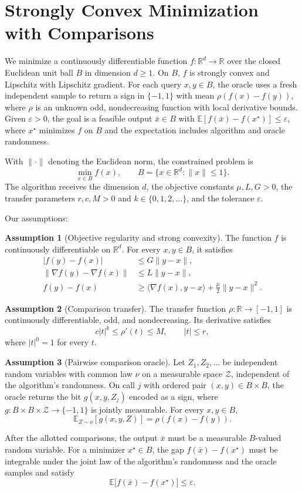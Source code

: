 \documentclass[10pt]{article}
\theoremstyle{definition}
\newtheorem{assumption}{Assumption}
\begin{document}
\section*{Strongly Convex Minimization with Comparisons}
We minimize a continuously differentiable function $f:\mathbb{R}^d\to\mathbb{R}$ over the closed Euclidean unit ball $B$ in dimension $d\geq 1$. On $B$, $f$ is strongly convex and Lipschitz with Lipschitz gradient. For each query $x,y\in B$, the oracle uses a fresh independent sample to return a sign in $\{-1,1\}$ with mean $\rho(f(x)-f(y))$, where $\rho$ is an unknown odd, nondecreasing function with local derivative bounds. Given $\varepsilon>0$, the goal is a feasible output $\bar{x}\in B$ with $\mathbb{E}[f(\bar{x})-f(x^\star)]\leq\varepsilon$, where $x^\star$ minimizes $f$ on $B$ and the expectation includes algorithm and oracle randomness.

With $\|\cdot\|$ denoting the Euclidean norm, the constrained problem is
\[
\min_{x\in B} f(x),\qquad B=\{x\in\mathbb{R}^d:\|x\|\leq 1\}.
\]
The algorithm receives the dimension $d$, the objective constants $\mu,L,G>0$, the transfer parameters $r,c,M>0$ and $k\in\{0,1,2,\ldots\}$, and the tolerance $\varepsilon$.

Our assumptions:
\begin{assumption}[Objective regularity and strong convexity]
The function $f$ is continuously differentiable on $\mathbb{R}^d$. For every $x,y\in B$, it satisfies
\[
\begin{aligned}
|f(y)-f(x)| &\leq G\|y-x\|,\\
\|\nabla f(y)-\nabla f(x)\| &\leq L\|y-x\|,\\
f(y)-f(x) &\geq \langle\nabla f(x),y-x\rangle
                 +\frac{\mu}{2}\|y-x\|^2.
\end{aligned}
\]
\end{assumption}

\begin{assumption}[Comparison transfer]
The transfer function $\rho:\mathbb{R}\to[-1,1]$ is continuously differentiable, odd, and nondecreasing. Its derivative satisfies
\[
c|t|^k\leq \rho'(t)\leq M,\qquad |t|\leq r,
\]
where $|t|^0=1$ for every $t$.
\end{assumption}

\begin{assumption}[Pairwise comparison oracle]
Let $Z_1,Z_2,\ldots$ be independent random variables with common law $\nu$ on a measurable space $\mathcal{Z}$, independent of the algorithm's randomness. On call $j$ with ordered pair $(x,y)\in B\times B$, the oracle returns the bit $g(x,y,Z_j)$ encoded as a sign, where $g:B\times B\times\mathcal{Z}\to\{-1,1\}$ is jointly measurable. For every $x,y\in B$,
\[
\mathbb{E}_{Z\sim\nu}[g(x,y,Z)]=\rho(f(x)-f(y)).
\]
\end{assumption}

After the allotted comparisons, the output $\bar{x}$ must be a measurable $B$-valued random variable. For a minimizer $x^\star\in B$, the gap $f(\bar{x})-f(x^\star)$ must be integrable under the joint law of the algorithm's randomness and the oracle samples and satisfy
\[
\mathbb{E}\bigl[f(\bar{x})-f(x^\star)\bigr]\leq\varepsilon.
\]
\end{document}
